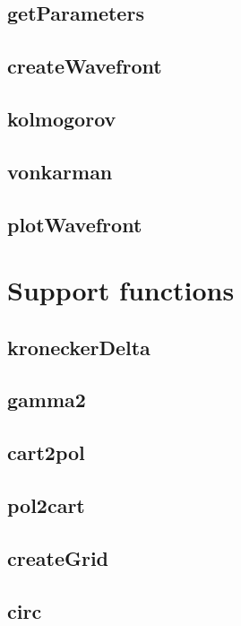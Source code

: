 \documentclass{article}
\begin{document}
\subsection{getParameters}

\subsection{createWavefront}

\subsection{kolmogorov}

\subsection{vonkarman}

\subsection{plotWavefront}

\section{Support functions}
\subsection{kroneckerDelta}

\subsection{gamma2}

\subsection{cart2pol}

\subsection{pol2cart}

\subsection{createGrid}

\subsection{circ}
\end{document}
